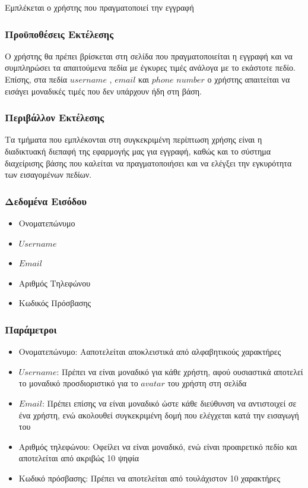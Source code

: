 \documentclass[12pt]{article}
\begin{document}
Εμπλέκεται ο χρήστης που πραγματοποιεί την εγγραφή

\subsubsection{Προϋποθέσεις Εκτέλεσης}

Ο χρήστης θα πρέπει βρίσκεται στη σελίδα που πραγματοποιείται η εγγραφή και να συμπληρώσει τα απαιτούμενα πεδία με έγκυρες τιμές ανάλογα με το εκάστοτε πεδίο. Επίσης, στα πεδία $username$ , $email$ και $phone$ $number$ ο χρήστης απαιτείται να εισάγει μοναδικές τιμές που δεν υπάρχουν ήδη στη βάση.

\subsubsection{Περιβάλλον Εκτέλεσης}

Τα τμήματα που εμπλέκονται στη συγκεκριμένη περίπτωση χρήσης είναι η διαδικτυακή διεπαφή της εφαρμογής μας για εγγραφή, καθώς και το σύστημα διαχείρισης βάσης που καλείται να πραγματοποιήσει και να ελέγξει την εγκυρότητα των εισαγομένων πεδίων.

\subsubsection{Δεδομένα Εισόδου}

\begin{itemize}
\item Ονοματεπώνυμο
\item $Username$
\item $Email$
\item Αριθμός Τηλεφώνου
\item Κωδικός Πρόσβασης
\end{itemize} 

\subsubsection{Παράμετροι}

\begin{itemize}
\item Ονοματεπώνυμο: Aαποτελείται αποκλειστικά από αλφαβητικούς χαρακτήρες
\item $Username$: Πρέπει να είναι μοναδικό για κάθε χρήστη, αφού ουσιαστικά αποτελεί το μοναδικό προσδιοριστικό για το $avatar$ του χρήστη στη σελίδα
\item $Email$: Πρέπει επίσης να είναι μοναδικό ώστε κάθε διεύθυνση να αντιστοιχεί σε ένα χρήστη, ενώ ακολουθεί συγκεκριμένη δομή που ελέγχεται κατά την εισαγωγή του
\item Αριθμός τηλεφώνου: Οφείλει να είναι μοναδικό, ενώ είναι προαιρετικό πεδίο και αποτελείται από ακριβώς 10 ψηφία
\item Κωδικό  πρόσβασης: Πρέπει να αποτελείται από τουλάχιστον 10 χαρακτήρες
\end{itemize}
\end{document}
